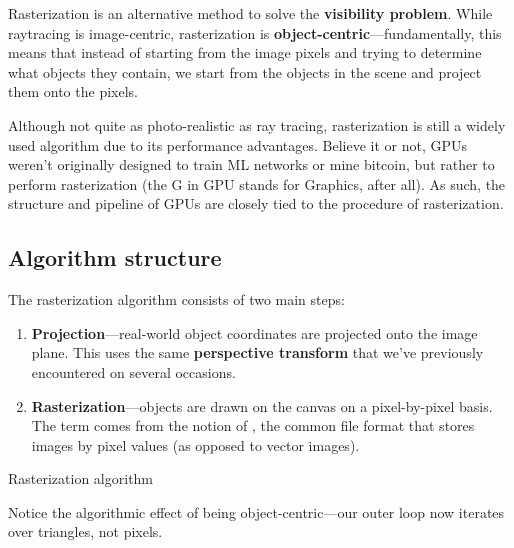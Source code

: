 \documentclass{article}
\begin{document}
Rasterization is an alternative method to solve the \textbf{visibility problem}.
While raytracing is image-centric, rasterization is \textbf{object-centric}—fundamentally, this means that instead of starting from the image pixels and trying to determine what objects they contain, we start from the objects in the scene and project them onto the pixels.

Although not quite as photo-realistic as ray tracing, rasterization is still a widely used algorithm due to its performance advantages.
Believe it or not, GPUs weren't originally designed to train ML networks or mine bitcoin, but rather to perform rasterization (the G in GPU stands for Graphics, after all).
As such, the structure and pipeline of GPUs are closely tied to the procedure of rasterization.

\subsection{Algorithm structure}

The rasterization algorithm consists of two main steps:
\begin{enumerate}
    \item \textbf{Projection}—real-world object coordinates are projected onto the image plane.
    This uses the same \textbf{perspective transform} that we've previously encountered on several occasions. 
    \item \textbf{Rasterization}—objects are drawn on the canvas on a pixel-by-pixel basis.
    The term comes from the notion of , the common file format that stores images by pixel values (as opposed to vector images).
\end{enumerate}

\begin{algorithm}[H]
    
    \caption{Rasterization algorithm}\label{algo_raster}
\end{algorithm}

Notice the algorithmic effect of being object-centric—our outer loop now iterates over triangles, not pixels.
\end{document}
